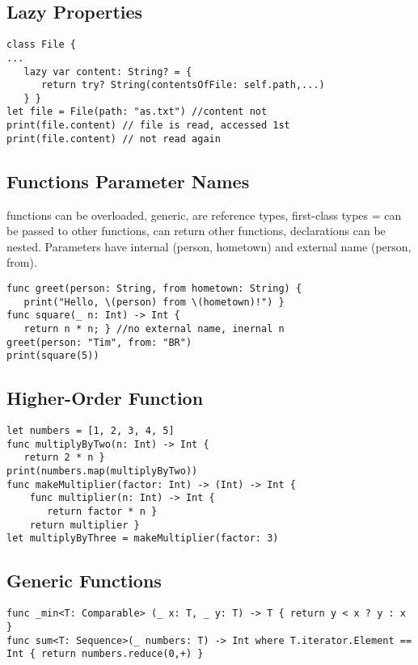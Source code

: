 \subsection{Lazy Properties}
\begin{lstlisting}
class File {
...
   lazy var content: String? = {
      return try? String(contentsOfFile: self.path,...)
   } }
let file = File(path: "as.txt") //content not
print(file.content) // file is read, accessed 1st
print(file.content) // not read again
\end{lstlisting}

\subsection{Functions Parameter Names}
functions can be overloaded, generic, are reference types, first-class types = can be passed to other functions, can return other functions, declarations can be nested. Parameters have internal (person, hometown) and external name (person, from).
\begin{lstlisting}
func greet(person: String, from hometown: String) {
   print("Hello, \(person) from \(hometown)!") }
func square(_ n: Int) -> Int {
   return n * n; } //no external name, inernal n
greet(person: "Tim", from: "BR")
print(square(5))
\end{lstlisting}

\subsection{Higher-Order Function}
\begin{lstlisting}
let numbers = [1, 2, 3, 4, 5]
func multiplyByTwo(n: Int) -> Int {
   return 2 * n }
print(numbers.map(multiplyByTwo))
func makeMultiplier(factor: Int) -> (Int) -> Int {
	func multiplier(n: Int) -> Int {
	   return factor * n }
	return multiplier }
let multiplyByThree = makeMultiplier(factor: 3)
\end{lstlisting}

\subsection{Generic Functions}
\begin{lstlisting}
func _min<T: Comparable> (_ x: T, _ y: T) -> T { return y < x ? y : x }
func sum<T: Sequence>(_ numbers: T) -> Int where T.iterator.Element == Int { return numbers.reduce(0,+) }
\end{lstlisting}

